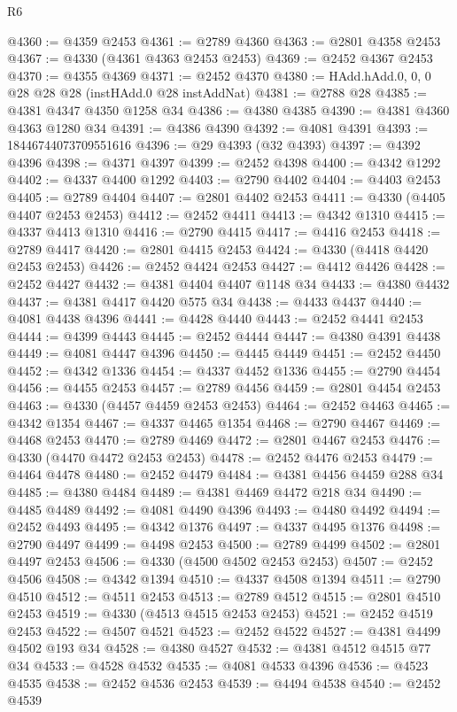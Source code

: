 \begin{lexlean}{R6}
\begin{coremodule}
@4360 := @4359 @2453
@4361 := @2789 @4360
@4363 := @2801 @4358 @2453
@4367 := @4330 (@4361 @4363 @2453 @2453)
@4369 := @2452 @4367 @2453
@4370 := @4355 @4369
@4371 := @2452 @4370
@4380 := HAdd.hAdd.{0, 0, 0} @28 @28 @28 (instHAdd.{0} @28 instAddNat)
@4381 := @2788 @28
@4385 := @4381 @4347 @4350 @1258 @34
@4386 := @4380 @4385
@4390 := @4381 @4360 @4363 @1280 @34
@4391 := @4386 @4390
@4392 := @4081 @4391
@4393 := 18446744073709551616
@4396 := @29 @4393 (@32 @4393)
@4397 := @4392 @4396
@4398 := @4371 @4397
@4399 := @2452 @4398
@4400 := @4342 @1292
@4402 := @4337 @4400 @1292
@4403 := @2790 @4402
@4404 := @4403 @2453
@4405 := @2789 @4404
@4407 := @2801 @4402 @2453
@4411 := @4330 (@4405 @4407 @2453 @2453)
@4412 := @2452 @4411
@4413 := @4342 @1310
@4415 := @4337 @4413 @1310
@4416 := @2790 @4415
@4417 := @4416 @2453
@4418 := @2789 @4417
@4420 := @2801 @4415 @2453
@4424 := @4330 (@4418 @4420 @2453 @2453)
@4426 := @2452 @4424 @2453
@4427 := @4412 @4426
@4428 := @2452 @4427
@4432 := @4381 @4404 @4407 @1148 @34
@4433 := @4380 @4432
@4437 := @4381 @4417 @4420 @575 @34
@4438 := @4433 @4437
@4440 := @4081 @4438 @4396
@4441 := @4428 @4440
@4443 := @2452 @4441 @2453
@4444 := @4399 @4443
@4445 := @2452 @4444
@4447 := @4380 @4391 @4438
@4449 := @4081 @4447 @4396
@4450 := @4445 @4449
@4451 := @2452 @4450
@4452 := @4342 @1336
@4454 := @4337 @4452 @1336
@4455 := @2790 @4454
@4456 := @4455 @2453
@4457 := @2789 @4456
@4459 := @2801 @4454 @2453
@4463 := @4330 (@4457 @4459 @2453 @2453)
@4464 := @2452 @4463
@4465 := @4342 @1354
@4467 := @4337 @4465 @1354
@4468 := @2790 @4467
@4469 := @4468 @2453
@4470 := @2789 @4469
@4472 := @2801 @4467 @2453
@4476 := @4330 (@4470 @4472 @2453 @2453)
@4478 := @2452 @4476 @2453
@4479 := @4464 @4478
@4480 := @2452 @4479
@4484 := @4381 @4456 @4459 @288 @34
@4485 := @4380 @4484
@4489 := @4381 @4469 @4472 @218 @34
@4490 := @4485 @4489
@4492 := @4081 @4490 @4396
@4493 := @4480 @4492
@4494 := @2452 @4493
@4495 := @4342 @1376
@4497 := @4337 @4495 @1376
@4498 := @2790 @4497
@4499 := @4498 @2453
@4500 := @2789 @4499
@4502 := @2801 @4497 @2453
@4506 := @4330 (@4500 @4502 @2453 @2453)
@4507 := @2452 @4506
@4508 := @4342 @1394
@4510 := @4337 @4508 @1394
@4511 := @2790 @4510
@4512 := @4511 @2453
@4513 := @2789 @4512
@4515 := @2801 @4510 @2453
@4519 := @4330 (@4513 @4515 @2453 @2453)
@4521 := @2452 @4519 @2453
@4522 := @4507 @4521
@4523 := @2452 @4522
@4527 := @4381 @4499 @4502 @193 @34
@4528 := @4380 @4527
@4532 := @4381 @4512 @4515 @77 @34
@4533 := @4528 @4532
@4535 := @4081 @4533 @4396
@4536 := @4523 @4535
@4538 := @2452 @4536 @2453
@4539 := @4494 @4538
@4540 := @2452 @4539

\end{coremodule}
\end{lexlean}
